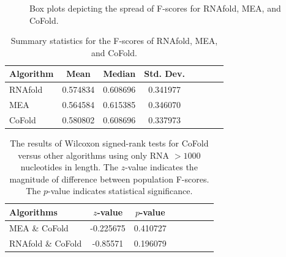 \documentclass[12pt, a4paper]{article}
\begin{document}
\begin{figure}
\begin{center}
\end{center}
\caption{Box plots depicting the spread of F-scores for RNAfold, MEA, and CoFold.}
\label{fig:boxplots}
\end{figure}


\begin{table}
\centering
\begin{tabular}{l*{6}{c}r}
Algorithm	& Mean & Median & Std. Dev. \\
\hline
RNAfold &  0.574834    &    0.608696 & 0.341977   \\
MEA & 0.564584    &    0.615385  & 0.346070\\
CoFold & 0.580802  &     0.608696 & 0.337973  \\
\end{tabular}
\caption{Summary statistics for the F-scores of RNAfold, MEA, and CoFold.}
\label{tab:summarystats}
\end{table}


\begin{table}
\centering
\begin{tabular}{l*{6}{c}r}
Algorithms	& $z$-value & $p$-value \\
\hline 
MEA \& CoFold &  -0.225675    &    0.410727   \\
RNAfold \& CoFold &  -0.85571    &    0.196079  \\
\end{tabular}
\caption{The results of Wilcoxon signed-rank tests for CoFold versus other algorithms using only RNA $> 1000$ nucleotides in length. The $z$-value indicates the magnitude of difference between population F-scores. The $p$-value indicates statistical significance.}
\label{tab:wilcoxon}
\end{table}
\end{document}
